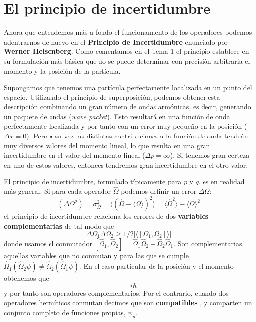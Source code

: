 \documentclass{tufte-handout}
\begin{document}
\section{El principio de incertidumbre}
Ahora que entendemos más a fondo el funcionamiento de los
operadores podemos adentrarnos de nuevo en el
\textbf{Principio de Incertidumbre} enunciado por 
\textbf{Werner Heisenberg}. Como comentamos en el Tema 1
el principio establece en su formulación más básica que 
no se puede determinar con precisión  arbitraria el momento
y la posición de la partícula. 

Supongamos que tenemos una partícula perfectamente 
localizada en un punto del espacio. Utilizando el
principio de superposición, podemos obtener esta 
descripción combinando un gran número de ondas 
armónicas, es decir, generando un paquete de
ondas (\textit{wave packet}). Esto resultará en una
función de onda perfectamente localizada y por tanto
con un error muy pequeño en la posición ($\Delta x=0$).
Pero a su vez las distintas contribuciones a la función 
de onda tendrán muy diversos valores del momento lineal, 
lo que resulta en una gran incertidumbre en el valor 
del momento lineal ($\Delta p=\infty$). Si tenemos gran
certeza en uno de estos valores, entonces
tendremos gran incertidumbre en el otro valor.

El principio de incertidumbre, formulado típicamente para
$p$ y $q$, es en realidad más general. Si para cada 
operador $\hat{\Omega}$ podemos definir un error $\Delta\Omega$:
\begin{equation}
    (\Delta\Omega^2)=\sigma^2_\Omega=\langle (\hat{\Omega} - \langle \Omega\rangle)^2 \rangle=
    \langle\hat{\Omega}^2\rangle - \langle\Omega\rangle^2
\end{equation}
el principio de incertidumbre relaciona los errores de dos
\textbf{variables complementarias} de tal modo que
\begin{equation}
\Delta\Omega_1\Delta\Omega_2\geq
1/2|\langle[\Omega_1,\Omega_2]\rangle|
\end{equation}
donde  usamos el conmutador  $[\hat{\Omega}_1,\hat{\Omega}_2] =
\hat{\Omega}_1\hat{\Omega}_2 -\hat{\Omega}_2\hat{\Omega}_1$.
Son complementarias aquellas variables que no conmutan y para
las que se cumple 
$\hat{\Omega}_1(\hat{\Omega}_2\psi)\neq\hat{\Omega}_2(\hat{\Omega}_1\psi)$.
En el caso particular de la posición y el momento obtenemos que
\begin{equation}
    [\hat{x},\hat{p}_x] = i\hbar
\end{equation}
y por tanto son operadores
complementarios. Por el contrario, cuando
dos operadores hermíticos conmutan decimos 
que son \textbf{compatibles }, y comparten un conjunto
completo de funciones propias, $\psi_n$.
\end{document}
